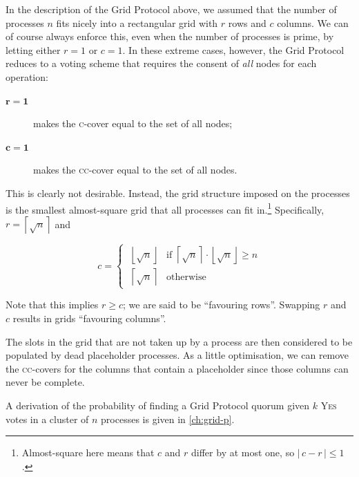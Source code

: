 \documentclass[12pt,chapterprefix=true,toc=bibliography,numbers=noendperiod,
               footnotes=multiple,twoside]{scrreprt}
\newcommand{\yes}{{\fontfamily{jkposn}\selectfont\textsc{Yes}}}
\begin{document}

In the description of the Grid Protocol above, we assumed that the number of processes \(n\) fits nicely into a rectangular grid with \(r\) rows and \(c\) columns. We can of course always enforce this, even when the number of processes is prime, by letting either \(r = 1\) or \(c = 1\). In these extreme cases, however, the Grid Protocol reduces to a voting scheme that requires the consent of \emph{all} nodes for each operation:

\begin{description}
    \item[\(\mathbf{r = 1}\)] makes the \textsc{c}-cover equal to the set of all nodes;
    \item[\(\mathbf{c = 1}\)] makes the \textsc{cc}-cover equal to the set of all nodes.
\end{description}

This is clearly not desirable. Instead, the grid structure imposed on the processes is the smallest almost-square grid that all processes can fit in.\footnote{Almost-square here means that \(c\) and \(r\) differ by at most one, so \(|\,c - r\,| \leq 1\).} Specifically, \( r = \left\lceil \sqrt{n} \right\rceil \) and

\begin{equation}
    c =
    \begin{cases}
        \;\left\lfloor \sqrt{n} \right\rfloor
                 & \text{if } \left\lceil \sqrt{n} \right\rceil
                        \cdot \left\lfloor \sqrt{n} \right\rfloor \geq n \\[0.5em]
        \;\left\lceil \sqrt{n} \right\rceil & \text{otherwise}
    \end{cases}
    \label{eq:grid-dims}
\end{equation}

Note that this implies \(r \geq c\); we are said to be \enquote{favouring rows}. Swapping \(r\) and \(c\) results in grids \enquote{favouring columns}.

The slots in the grid that are not taken up by a process are then considered to be populated by dead placeholder processes. As a little optimisation, we can remove the \textsc{cc}-covers for the columns that contain a placeholder since those columns can never be complete.

A derivation of the probability of finding a Grid Protocol quorum given \(k\) \yes{} votes in a cluster of \(n\) processes is given in \cref{ch:grid-p}.
\end{document}
